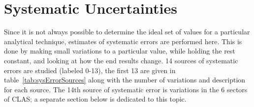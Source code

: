 \chapter{Systematic Uncertainties}
\label{cha:SystematicUncertainties}

Since it is not always possible to determine the ideal set of values for a particular analytical technique, estimates of systematic errors are performed here.
This is done by making small variations to a particular value, while holding the rest constant, and looking at how the end results change.
14 sources of systematic errors are studied (labeled 0-13), the first 13 are given in table~\ref{tab:sysErrorSources} along with the number of variations and description for each source.
The 14th source of systematic error is variations in the 6 sectors of CLAS; a separate section below is dedicated to this topic.

